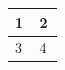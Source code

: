 \par\medskip
\begin{longtable}{|p{0.45\linewidth}|p{0.45\linewidth}|}
\hline
1

 & 2

 \\
\hline
3

 & 4

 \\
\hline
\end{longtable}
\medskip

